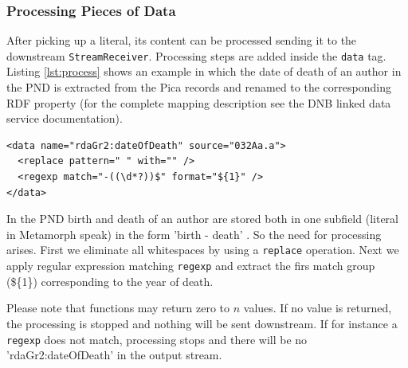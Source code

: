 \documentclass[12pt,a4paper]{article}
\begin{document}
\subsubsection{Processing Pieces of Data}\label{process}
After picking up a literal, its content can be processed sending it to the downstream {\tt StreamReceiver}.
Processing steps are added inside the {\tt data} tag. Listing \ref{lst:process} shows an example in which the date of death of an author in the PND is extracted from the Pica records and renamed to the corresponding RDF property (for the complete mapping description see the DNB linked data service documentation).
\begin{lstlisting}[float=htb, label=lst:process,caption=Processing data within the {\tt data} tag]
<data name="rdaGr2:dateOfDeath" source="032Aa.a">
  <replace pattern=" " with="" />
  <regexp match="-((\d*?))$" format="${1}" />
</data>
\end{lstlisting}

In the PND birth and death of an author are stored both in one subfield (literal in Metamorph speak) in the form 'birth - death' . So the need for processing arises.
First we eliminate all whitespaces by using a {\tt replace} operation. Next we apply regular expression matching {\tt regexp} and extract the firs match group ({\$\{1\}}) corresponding to the year of death.

Please note that functions may return zero to $n$ values. If no value is returned, the processing is stopped and nothing will be sent downstream. If for instance a {\tt regexp} does not match, processing stops and there will be no 'rdaGr2:dateOfDeath' in the output stream.
\end{document}
